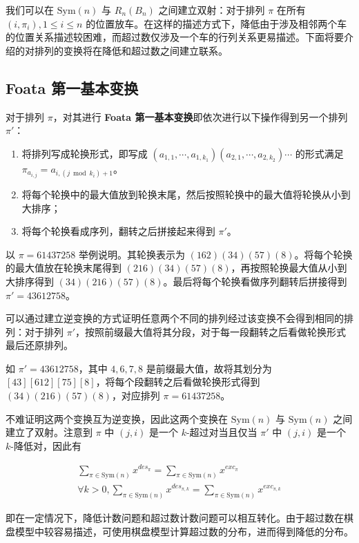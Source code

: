 \documentclass{noithesis}
\begin{document}
	我们可以在 $\mathrm{Sym}(n)$ 与 $R_n(B_n)$ 之间建立双射：对于排列 $\pi$ 在所有 $(i,\pi_i) , 1 \leq i \leq n$ 的位置放车。在这样的描述方式下，降低由于涉及相邻两个车的位置关系描述较困难，而超过数仅涉及一个车的行列关系更易描述。下面将要介绍的对排列的变换将在降低和超过数之间建立联系。
	
	\subsection{Foata 第一基本变换}
	\begin{definition}
		对于排列 $\pi$，对其进行 \textbf{Foata 第一基本变换}即依次进行以下操作得到另一个排列 $\pi'$：
		\begin{enumerate}
			\item 将排列写成轮换形式，即写成 $(a_{1,1},\cdots,a_{1,k_1})(a_{2,1},\cdots,a_{2,k_2})\cdots$ 的形式满足 $\pi_{a_{i,j}} = a_{i,(j \bmod k_i) + 1}$。
			\item 将每个轮换中的最大值放到轮换末尾，然后按照轮换中的最大值将轮换从小到大排序；
			\item 将每个轮换看成序列，翻转之后拼接起来得到 $\pi'$。
		\end{enumerate}
	\end{definition}
	
	以 $\pi = 61437258$ 举例说明。其轮换表示为 $(162)(34)(57)(8)$。将每个轮换的最大值放在轮换末尾得到 $(216)(34)(57)(8)$，再按照轮换最大值从小到大排序得到 $(34)(216)(57)(8)$。最后将每个轮换看做序列翻转后拼接得到 $\pi' = 43612758$。
	
	可以通过建立逆变换的方式证明任意两个不同的排列经过该变换不会得到相同的排列：对于排列 $\pi'$，按照前缀最大值将其分段，对于每一段翻转之后看做轮换形式最后还原排列。
	
	如 $\pi' = 43612758$，其中 $4,6,7,8$ 是前缀最大值，故将其划分为 $[43][612][75][8]$，将每个段翻转之后看做轮换形式得到 $(34)(216)(57)(8)$，对应排列 $\pi = 61437258$。
	
	不难证明这两个变换互为逆变换，因此这两个变换在 $\mathrm{Sym}(n)$ 与 $\mathrm{Sym}(n)$ 之间建立了双射。注意到 $\pi$ 中 $(j,i)$ 是一个 $k$-超过对当且仅当 $\pi'$ 中 $(j,i)$ 是一个 $k$-降低对，因此有
	\begin{theorem}\label{des=exc}
		\begin{gather}
		\sum_{\pi \in \mathrm{Sym}(n)} x^{des_\pi} = \sum_{\pi \in  \mathrm{Sym}(n)}x^{exc_{\pi}} \\
		\forall k > 0 , \sum_{\pi \in \mathrm{Sym}(n)} x^{des_{\pi,k}} = \sum_{\pi \in  \mathrm{Sym}(n)}x^{exc_{\pi,k}}
		\end{gather}
	\end{theorem}
	即在一定情况下，降低计数问题和超过数计数问题可以相互转化。由于超过数在棋盘模型中较容易描述，可使用棋盘模型计算超过数的分布，进而得到降低的分布。
	
\end{document}
